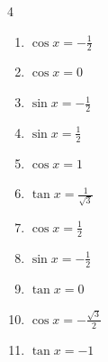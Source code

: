 \begin{multicols}{4}
\begin{enumerate}

  \item $\displaystyle \cos{x}  = -\frac{1}{2}$


  \item $\displaystyle \cos{x}  = 0$


\columnbreak %

\resetques

  \item $\displaystyle \sin{x}  = -\frac{1}{2}$


  \item $\displaystyle \sin{x}  = \frac{1}{2}$


  \item $\displaystyle \cos{x}  = 1$


  \item $\displaystyle \tan{x}  = \frac{1}{\sqrt{3}}$


  \item $\displaystyle \cos{x}  = \frac{1}{2}$


  \item $\displaystyle \sin{x}  = -\frac{1}{2}$


  \item $\displaystyle \tan{x}  = 0$


  \item $\displaystyle \cos{x}  = -\frac{\sqrt{3}}{2}$


  \item $\displaystyle \tan{x}  = -1$


\end{enumerate}
\end{multicols}
